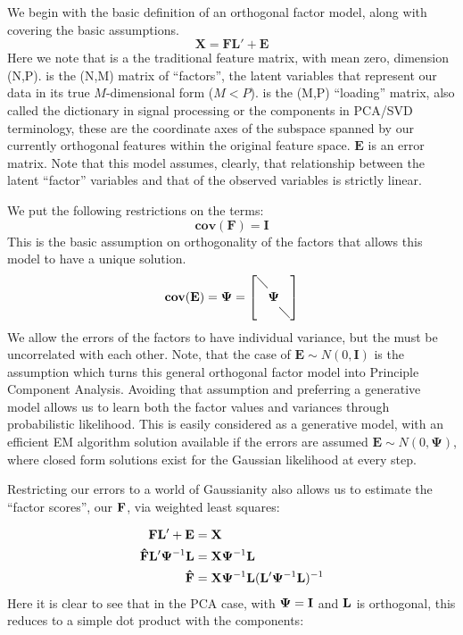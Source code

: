 \documentclass[a4paper,12pt]{article}
\makeatletter
\newcommand{\diagmat}[1]{\left[%
\begin{array}{@{}c@{}c@{}c@{}}
\diagdown &    & \\
          & #1 & \\
          &    & \diagdown
\end{array}\right]
}
\makeatother
\begin{document}
We begin with the basic definition of an orthogonal factor model, along with covering the basic assumptions.
%
\begin{equation}
\mathbf{X} = \mathbf{F}\mathbf{L'} + \mathbf{E}
\end{equation}
%
Here we note that \X is a the traditional feature matrix, with mean zero, dimension (N,P). \F is the (N,M) matrix of ``factors'', the latent variables that represent our data in its true $M$-dimensional form ($M < P$). \Load  is the (M,P) ``loading'' matrix, also called the dictionary in signal processing or the components in PCA/SVD terminology, these are the coordinate axes of the subspace spanned by our currently orthogonal features within the original feature space. $\mathbf{E}$ is an error matrix. Note that this model assumes, clearly, that relationship between the latent ``factor'' variables and that of the observed variables is strictly linear.

We put the following restrictions on the terms:
%
$$
\mathbf{cov}(\mathbf{F}) = \mathbf{I}
$$
%
This is the basic assumption on orthogonality of the factors that allows this model to have a unique solution.
$$
\mathbf{cov}(\mathbf{E}) = \mathbf{\Psi} = \diagmat{\mathbf{\Psi}}
$$
%
We allow the errors of the factors to have individual variance, but the must be uncorrelated with each other. Note, that the case of $\mathbf{E} \sim N(0, \mathbf{I})$ is the assumption which turns this general orthogonal factor model into Principle Component Analysis. Avoiding that assumption and preferring a generative model allows us to learn both the factor values and variances through probabilistic likelihood. This is easily considered as a generative model, with an efficient EM algorithm solution available if the errors are assumed $\mathbf{E} \sim N(0, \mathbf{\Psi})$, where closed form solutions exist for the Gaussian likelihood at every step.

Restricting our errors to a world of Gaussianity also allows us to estimate the ``factor scores'', our $\mathbf{F}$, via weighted least squares:

\begin{align*}
\mathbf{F}\mathbf{L'} + \mathbf{E} &= \mathbf{X} \\
\mathbf{\hat{F}}\mathbf{L'}\mathbf{\Psi}^{-1}\mathbf{L} &= \mathbf{X}\mathbf{\Psi}^{-1}\mathbf{L}  \\
\mathbf{\hat{F}} &= \mathbf{X}\mathbf{\Psi}^{-1}\mathbf{L}(\mathbf{L'}\mathbf{\Psi}^{-1}\mathbf{L})^{-1}
\end{align*}
%
Here it is clear to see that in the PCA case, with $\mathbf{\Psi} = \mathbf{I}$ and $\mathbf{L}$ is orthogonal, this reduces to a simple dot product with the components:
\end{document}
